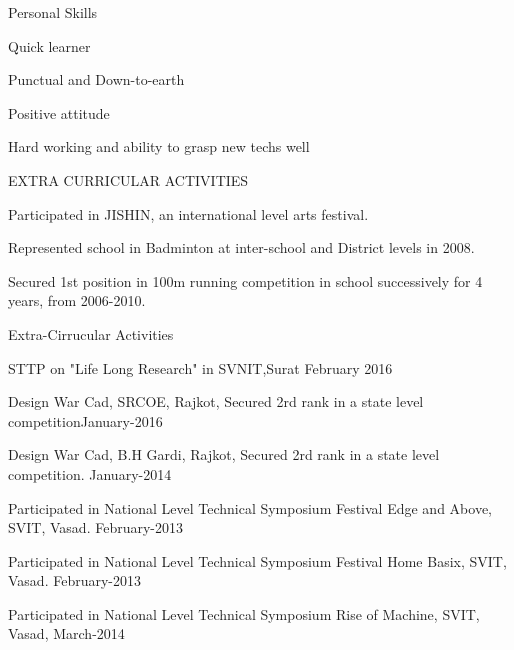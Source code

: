 \documentclass{resume} %
\begin{document}

\begin{rSection}{Personal Skills} \itemsep -3pt  

\item Quick learner \\ 
\item Punctual and Down-to-earth
\item Positive attitude
\item Hard working and ability to grasp new techs well

\end{rSection} 

\begin{rSection}{EXTRA CURRICULAR ACTIVITIES}

\begin{rSubsection}{}{} {} {} 
\item Participated in JISHIN, an international level arts festival.
\item Represented school in Badminton at inter-school and District levels in 2008.
\item Secured 1st position in 100m running competition in school successively for 4 years, from 2006-2010.
\end{rSubsection}



\begin{rSubsection}{}{}{} {}
 \item 
\end{rSubsection}
 
\end{rSection}

\begin{rSection}{Extra-Cirrucular Activities} \itemsep -1pt {}   
\item STTP on "Life Long Research" in SVNIT,Surat \hfill February 2016
\item Design War Cad, SRCOE, Rajkot, Secured 2rd rank in a state level competition\hfill January-2016
\item  Design War Cad, B.H Gardi, Rajkot, Secured 2rd rank in a
state level competition. \hfill January-2014 
\item Participated in National Level Technical Symposium Festival Edge and Above, SVIT, Vasad. \hfill February-2013
\item Participated in National Level Technical Symposium Festival Home Basix, SVIT, Vasad.
 \hfill  February-2013 
\item Participated in National Level Technical Symposium Rise of Machine, SVIT, Vasad,  \hfill March-2014 
 

\end{rSection}
\end{document}
